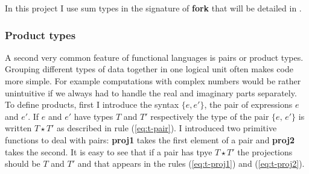 \documentclass[12pt,twoside,notitlepage]{report}
\theoremstyle{plain}%
\theoremstyle{definition}
\theoremstyle{remark}
\begin{document}
In this project I use sum types in the signature of \textbf{fork} that will be detailed in .  


\subsubsection{Product types}
A second very common feature of functional languages is pairs or product types. Grouping different types of data together in one logical unit often makes code more simple. For example computations with complex numbers would be rather unintuitive if we always had to handle the real and imaginary parts separately. To define products, first I introduce the syntax $ \{e, e' \} $, the pair of expressions $ e $ and $ e' $. If $ e $ and $ e' $ have types $ T $ and $ T' $ respectively the type of the pair $ \{e,\, e'\} $ is written $ T\star T' $ as described in rule (\ref{eq:t-pair}). I introduced two primitive functions to deal with pairs: \textbf{proj1} takes the first element of a pair and \textbf{proj2} takes the second. It is easy to see that if a pair has tpye  $ T\star T' $ the projections should be $ T $ and $ T' $ and that appears in the rules (\ref{eq:t-proj1}) and (\ref{eq:t-proj2}).
\end{document}
